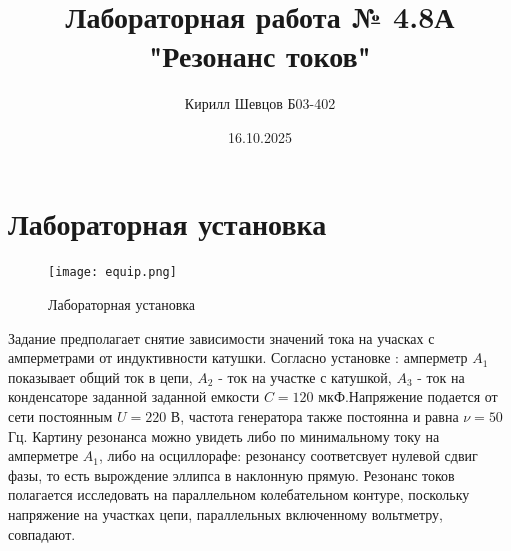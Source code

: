 \documentclass[a4paper, 12pt]{article}
\title{Лабораторная работа № 4.8А "Резонанс токов"}
\author{Кирилл Шевцов Б03-402}
\date{16.10.2025}
\begin{document}
\maketitle
\section*{Лабораторная установка}
\begin{figure}[htbp]
    \centering
    \texttt{[image: equip.png]}
    \label{Лабораторная установка}
    \caption{Лабораторная установка}
\end{figure}
Задание предполагает снятие зависимости значений тока на учасках с амперметрами от индуктивности катушки.
Согласно установке : амперметр $A_{1}$ показывает общий ток в цепи, $A_{2}$ - ток на участке с катушкой, $A_{3}$ - ток на конденсаторе заданной
заданной емкости $C = 120$ мкФ.\newline Напряжение подается от сети постоянным $U = 220$ В, частота генератора также постоянна и равна $\nu = 50$ Гц.\newline
Картину резонанса можно увидеть либо по минимальному току на амперметре $A_{1}$, либо на осциллорафе: резонансу соответсвует нулевой сдвиг фазы,
то есть вырождение эллипса в наклонную прямую.\newline
Резонанс токов полагается исследовать на параллельном колебательном контуре, поскольку напряжение на участках цепи, параллельных включенному
вольтметру, совпадают.
\end{document}
